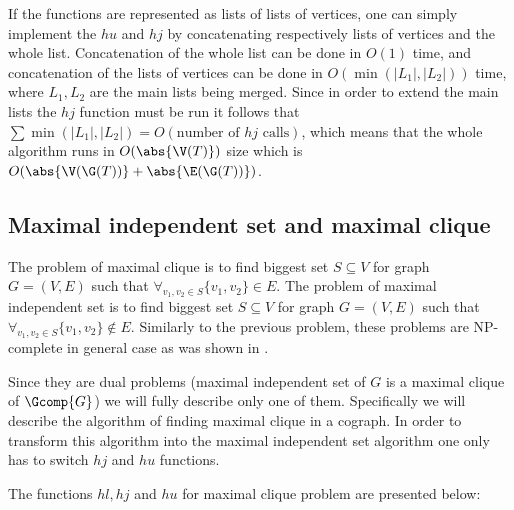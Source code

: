 If the functions are represented as lists of lists of vertices, one can simply implement the $hu$ and $hj$ by concatenating respectively lists of vertices and the whole list. Concatenation of the whole list can be done in $O(1)$ time, and concatenation of the lists of vertices can be done in $O(\min(|L_1|, |L_2|))$ time, where $L_1, L_2$ are the main lists being merged. Since in order to extend the main lists the $hj$ function must be run it follows that $\sum \min(|L_1|, |L_2|) = O(\text{number of $hj$ calls})$, which means that the whole algorithm runs in $O(\abs{\V(T)})$ size which is $O(\abs{\V(\G(T))} + \abs{\E(\G(T))})$.

\subsection{Maximal independent set and maximal clique}
\label{32-cliq}

The problem of maximal clique is to find biggest set $S \subseteq V$ for graph $G = (V,E)$ such that $\forall_{v_1, v_2 \in S} \{v_1, v_2\} \in E$. The problem of maximal independent set is to find biggest set $S \subseteq V$ for graph $G = (V,E)$ such that $\forall_{v_1, v_2 \in S} \{v_1, v_2\} \not\in E$. Similarly to the previous problem, these problems are NP-complete in general case as was shown in \cite{karp}.

Since they are dual problems (maximal independent set of $G$ is a maximal clique of $\Gcomp{G}$) we will fully describe only one of them. Specifically we will describe the algorithm of finding maximal clique in a cograph. In order to transform this algorithm into the maximal independent set algorithm one only has to switch $hj$ and $hu$ functions.

The functions $hl, hj$ and $hu$ for maximal clique problem are presented below:

